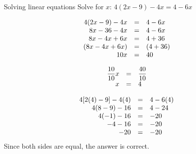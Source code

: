 \begin{wex}
{Solving linear equations }
{Solve for $x$: $4(2x-9)-4x=4-6x$}
{

\begin{equation*}
    \begin{array}{ccl}\hfill 4(2x-9)-4x& =& 4-6x\hfill  \\ 
	\hfill 8x-36-4x& =& 4-6x\hfill   \\ 
	\hfill 8x-4x+6x& =& 4+36\hfill  \\ 
	\hfill (8x-4x+6x)& =& (4+36)\hfill   \\   
	\hfill 10x& =& 40\hfill  
    \end{array}
\end{equation*}

\begin{equation*}
    \begin{array}{ccl}
	\hfill \dfrac{10}{10}x& =& \dfrac{40}{10}\hfill\\
	\hfill x& =& 4\hfill  
    \end{array}
\end{equation*}


\begin{equation*}
    \begin{array}{ccl}\hfill 4[2(4)-9]-4(4)& =& 4-6(4)\hfill \\
	\hfill 4(8-9)-16& =& 4-24\hfill \\
	\hfill 4(-1)-16& =& -20\hfill \\
	\hfill -4-16& =& -20\hfill \\
	\hfill -20& =& -20\hfill 
    \end{array}
\end{equation*}
Since both sides are equal, the answer is correct. 
}
\end{wex}

